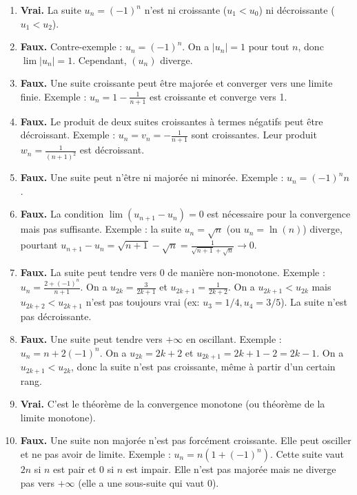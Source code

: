 \documentclass[]{exercices}
\begin{document}
\begin{solution}
	\begin{enumerate}
		\item \textbf{Vrai.} La suite $u_n = (-1)^n$ n'est ni croissante ($u_1 < u_0$) ni décroissante ($u_1 < u_2$).
		\item \textbf{Faux.} Contre-exemple : $u_n = (-1)^n$. On a $|u_n|=1$ pour tout $n$, donc $\lim |u_n| = 1$. Cependant, $(u_n)$ diverge.
		\item \textbf{Faux.} Une suite croissante peut être majorée et converger vers une limite finie. Exemple : $u_n = 1 - \frac{1}{n+1}$ est croissante et converge vers 1.
		\item \textbf{Faux.} Le produit de deux suites croissantes à termes négatifs peut être décroissant. Exemple : $u_n = v_n = -\frac{1}{n+1}$ sont croissantes. Leur produit $w_n = \frac{1}{(n+1)^2}$ est décroissant.
		\item \textbf{Faux.} Une suite peut n'être ni majorée ni minorée. Exemple : $u_n = (-1)^n n$.
		\item \textbf{Faux.} La condition $\lim(u_{n+1}-u_n)=0$ est nécessaire pour la convergence mais pas suffisante. Exemple : la suite $u_n = \sqrt{n}$ (ou $u_n = \ln(n)$) diverge, pourtant $u_{n+1}-u_n = \sqrt{n+1}-\sqrt{n} = \frac{1}{\sqrt{n+1}+\sqrt{n}} \to 0$.
		\item \textbf{Faux.} La suite peut tendre vers 0 de manière non-monotone. Exemple : $u_n = \frac{2+(-1)^n}{n+1}$. On a $u_{2k} = \frac{3}{2k+1}$ et $u_{2k+1}=\frac{1}{2k+2}$. On a $u_{2k+1} < u_{2k}$ mais $u_{2k+2} < u_{2k+1}$ n'est pas toujours vrai (ex: $u_3=1/4, u_4=3/5$). La suite n'est pas décroissante.
		\item \textbf{Faux.} Une suite peut tendre vers $+\infty$ en oscillant. Exemple : $u_n = n + 2(-1)^n$. On a $u_{2k}=2k+2$ et $u_{2k+1}=2k+1-2=2k-1$. On a $u_{2k+1} < u_{2k}$, donc la suite n'est pas croissante, même à partir d'un certain rang.
		\item \textbf{Vrai.} C'est le théorème de la convergence monotone (ou théorème de la limite monotone).
		\item \textbf{Faux.} Une suite non majorée n'est pas forcément croissante. Elle peut osciller et ne pas avoir de limite. Exemple : $u_n = n(1+(-1)^n)$. Cette suite vaut $2n$ si $n$ est pair et $0$ si $n$ est impair. Elle n'est pas majorée mais ne diverge pas vers $+\infty$ (elle a une sous-suite qui vaut 0).
	\end{enumerate}
\end{solution}
\end{document}
